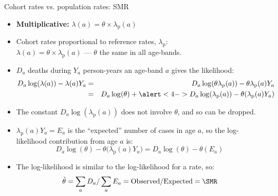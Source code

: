 \begin{frame}{Cohort rates vs. population rates: SMR}
  \begin{itemize}
  \item \textbf{Multiplicative:} $\lambda(a) = \theta \times \lambda_\text{p}(a)$
  \item Cohort rates proportional to reference rates, $\lambda_\text{p}$:\\
    $\lambda(a) = \theta \times \lambda_\text{p}(a)$ --- $\theta$ the same in all
    age-bands.
  \item $D_a$ deaths during $Y_a$ person-years an age-band $a$ gives
    the likelihood:
 \begin{eqnarray*}
    D_a \log(\lambda(a)) - \lambda(a) Y_a
  & = & D_a \log(\theta\lambda_\text{p}(a)) - \theta\lambda_\text{p}(a) Y_a \\
  & = & D_a \log(\theta)+ \alert<4->{D_a \log(\lambda_\text{p}(a))} - \theta(\lambda_\text{p}(a) Y_a)
\end{eqnarray*}
\item The constant \alert<4->{$D_a \log(\lambda_\text{p}(a))$} does not involve $\theta$,
  and so can be dropped.
\end{itemize}
\end{frame}

\begin{frame}
  \begin{itemize}
  \item $\lambda_\text{p}(a)Y_a = E_a$ is the ``expected'' number of cases in
    age $a$, so the log-likelihood contribution from age $a$ is:
\[
 D_a \log(\theta) - \theta\big(\lambda_\text{p}(a) Y_a\big) =
 D_a \log(\theta) - \theta(E_a)
\]
\item The log-likelihood is similar to the log-likelihood for a rate, so:
\[
  \hat\theta = \sum_aD_a / \sum_aE_a =
  \mbox{Observed}/\mbox{Expected}
  = \SMR
\]
\end{itemize}
\end{frame}

